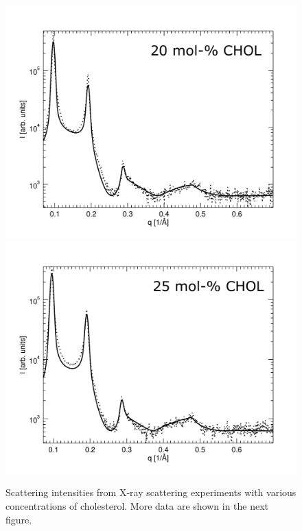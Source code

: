 \documentclass[journal=jpcbfk]{achemso}
\begin{document}
\begin{figure}[htb!]
    \includegraphics[width=0.49\linewidth]{../FIGS/scatt20.pdf}
    \includegraphics[width=0.49\linewidth]{../FIGS/scatt25.pdf}
    \caption{Scattering intensities from X-ray scattering experiments with various concentrations of cholesterol. More data are shown in the next figure.}
    \label{SIfig:scattering1}
\end{figure}
\end{document}
